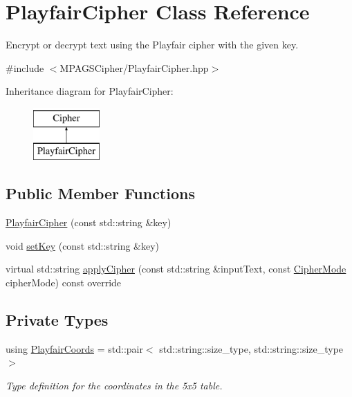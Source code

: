 \hypertarget{class_playfair_cipher}{}\section{Playfair\+Cipher Class Reference}
\label{class_playfair_cipher}


Encrypt or decrypt text using the Playfair cipher with the given key.  




{\ttfamily \#include $<$M\+P\+A\+G\+S\+Cipher/\+Playfair\+Cipher.\+hpp$>$}

Inheritance diagram for Playfair\+Cipher\+:\begin{figure}[H]
\begin{center}
\leavevmode
\includegraphics[height=2.000000cm]{class_playfair_cipher}
\end{center}
\end{figure}
\subsection*{Public Member Functions}
\begin{DoxyCompactItemize}
\item 
\hyperlink{class_playfair_cipher_abb71ab96f33cdcb0651c23f03952aef4}{Playfair\+Cipher} (const std\+::string \&key)
\item 
void \hyperlink{class_playfair_cipher_ab4a3d263f9101cb7aa50d4ad39c15737}{set\+Key} (const std\+::string \&key)
\item 
virtual std\+::string \hyperlink{class_playfair_cipher_ac5e23f02becb84cb26d89dadeed87b05}{apply\+Cipher} (const std\+::string \&input\+Text, const \hyperlink{_cipher_mode_8hpp_ac3adaabf9bad553901589ddf3de6daf5}{Cipher\+Mode} cipher\+Mode) const override
\end{DoxyCompactItemize}
\subsection*{Private Types}
\begin{DoxyCompactItemize}
\item 
using \hyperlink{class_playfair_cipher_a8e1ee213c8affc4e64fd29fd236a42ee}{Playfair\+Coords} = std\+::pair$<$ std\+::string\+::size\+\_\+type, std\+::string\+::size\+\_\+type $>$\hypertarget{class_playfair_cipher_a8e1ee213c8affc4e64fd29fd236a42ee}{}\label{class_playfair_cipher_a8e1ee213c8affc4e64fd29fd236a42ee}

\begin{DoxyCompactList}\small\item\em Type definition for the coordinates in the 5x5 table. \end{DoxyCompactList}\end{DoxyCompactItemize}
